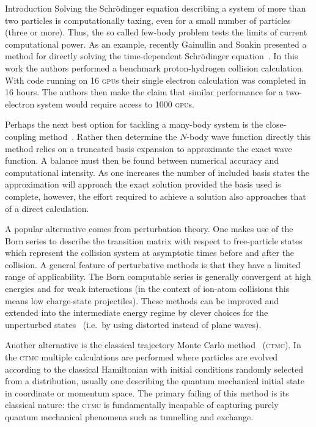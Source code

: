 \documentclass[a5paper, 9 pt]{extreport}
\begin{document}
\begin{chapter}{Introduction \label{chap:intro}}
   Solving the Schr\"{o}dinger equation describing a system of more than two particles is
   computationally taxing, even for a small number of particles (three or more). Thus, the so called
   few-body problem tests the limits of current computational power. As an example, recently Gainullin
   and Sonkin presented a method for directly solving the time-dependent Schr\"{o}dinger
   equation~\cite{gpuCalc}. In this work the authors performed a benchmark proton-hydrogen collision
   calculation. With code running on 16 \textsc{gpu}s their single electron calculation was completed in
   16 hours. The authors then make the claim that similar performance for a two-electron system would
   require access to 1000 \textsc{gpu}s.

   Perhaps the next best option for tackling a many-body system is the close-coupling
   method~\cite{ccRev}. Rather then determine the $N$-body wave function directly this method relies on
   a truncated basis expansion to approximate the exact wave function. A balance must then be found
   between numerical accuracy and computational intensity. As one increases the number of included basis
   states the approximation will approach the exact solution provided the basis used is complete,
   however, the effort required to achieve a solution also approaches that of a direct calculation.

   A popular alternative comes from perturbation theory. One makes use of the Born series to describe
   the transition matrix with respect to free-particle states which represent the collision system at
   asymptotic times before and after the collision. A general feature of perturbative methods is that
   they have a limited range of applicability. The Born computable series is generally convergent at
   high energies and for weak interactions (in the context of ion-atom collisions this means low
   charge-state projectiles). These methods can be improved and extended into the intermediate energy
   regime by clever choices for the unperturbed states~\cite{perRev1, perRev2} (i.e.\ by using distorted
   instead of plane waves).

   Another alternative is the classical trajectory Monte Carlo method~\cite{ctmcRev} (\textsc{ctmc}). In
   the \textsc{ctmc} multiple calculations are performed where particles are evolved according to the
   classical Hamiltonian with initial conditions randomly selected from a distribution, usually one
   describing the quantum mechanical initial state in coordinate or momentum space. The primary failing
   of this method is its classical nature: the \textsc{ctmc} is fundamentally incapable of capturing
   purely quantum mechanical phenomena such as tunnelling and exchange.


\end{chapter}
\end{document}
